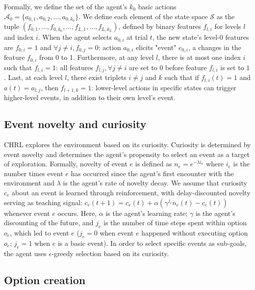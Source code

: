 \documentclass{article}
\begin{document}
Formally, we define the set of the agent's $k_0$ basic actions $\mathcal{A}_0 = \{a_{0, 1}, a_{0, 2}, \ldots, a_{0, k_0}\}$. We define each element of the state space $\mathcal{S}$ as the tuple $(f_{0, 1}, \ldots, f_{0, k_0}, \ldots, f_{L, 1}, \ldots, f_{L, k_L})$, defined by binary features $f_{l, i}$ for levels $l$ and index $i$. When the agent selects $a_{0,i}$ at trial $t$, the new state's level-0 features are $f_{0,i}=1$ and $\forall j \neq i, f_{0,j}=0$: action $a_{0, i}$ elicits "event" $e_{0, i}$, a changes in the feature $f_{0, i}$ from 0 to 1. Furthermore, at any level $l$, there is at most one index $i$ such that $f_{l,i}=1$: all features $f_{l, j}, \forall j\neq i$ are set to $0$ before feature $f_{l, i}$ is set to $1$. Last, at each level $l$, there exist triplets $i \neq j$ and $k$ such that if $f_{l,i}(t)=1$ and $a(t)=a_{l,j}$, then $f_{l+1, k}=1$: lower-level actions in specific states can trigger higher-level events, in addition to their own level's event.

\subsection{Event novelty and curiosity}

CHRL explores the environment based on its curiosity. Curiosity is determined by event novelty and determines the agent's propensity to select an event as a target of exploration. Formally, novelty of event $e$ is defined as $n_e = e^{-\lambda i_e}$ where $i_e$ is the number times event $e$ has occurred since the agent's first encounter with the environment and $\lambda$ is the agent's rate of novelty decay. We assume that curiosity $c_e$ about an event is learned through reinforcement, with delay-discounted novelty serving as teaching signal: $c_e(t+1) = c_e(t) + \alpha (\gamma^{j_e} n_e(t) - c_e(t))$ whenever event $e$ occurs. Here, $\alpha$ is the agent's learning rate; $\gamma$ is the agent's discounting of the future, and $j_e$ is the number of time steps spent within option $o_e$, which led to event $e$ ($j_e = 0$ when event $e$ happened without executing option $o_e$; $j_e = 1$ when $e$ is a basic event). In order to select specific events as sub-goals, the agent uses $\epsilon$-greedy selection based on its curiosity.

\subsection{Option creation}
\end{document}
